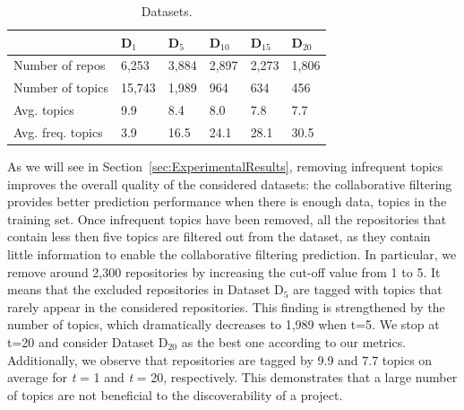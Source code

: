 \begin{table}[h!]
	\caption{Datasets.}
	\begin{tabular}{|l|p{0.68cm}|p{0.68cm}|p{0.68cm}|p{0.68cm}|p{0.68cm}|} \hline
		 & \textbf{ D$_{1}$} & \textbf{D$_{5}$} & \textbf{ D$_{10}$} & \textbf{D$_{15}$} & \textbf{D$_{20}$} \\ \hline
		Number of repos & 6,253 & 3,884 & 2,897  & 2,273 & 1,806  \\ \hline
		Number of topics & 15,743 & 1,989 & 964 & 634 & 456 \\ \hline
		Avg. topics & 9.9 & 8.4 & 8.0  & 7.8 & 7.7 \\ \hline
		Avg. freq. topics & 3.9  & 16.5  & 24.1  & 28.1  & 30.5  \\ \hline
	\end{tabular}	
	\label{tab:Datasets}	
\end{table}



As we will see in Section~\ref{sec:ExperimentalResults}, removing infrequent topics improves the overall quality of the considered datasets: %
the collaborative filtering provides better prediction performance when there is enough data, \ie topics in the training set. %
Once infrequent topics have been removed, all the repositories that contain less then five topics are filtered out from the dataset, as they contain little information to enable the collaborative filtering prediction. In particular, we remove around 2,300 repositories by increasing the cut-off value from 1 to 5. It means that the excluded repositories in Dataset D$_5$ are tagged with topics that rarely appear in the considered repositories. This finding is strengthened by the number of topics, which dramatically decreases to 1,989 when t=5. %
We stop at t=20 and consider Dataset D$_{20}$ as the best one according to our metrics. Additionally, we observe that repositories are tagged by 9.9 and 7.7 topics on average for \emph{t} = 1 and \emph{t} = 20, respectively. This demonstrates that a large number of topics are not beneficial to the discoverability of a project.

